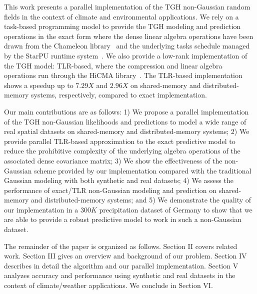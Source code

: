 \documentclass[conference]{IEEEtran}
\begin{document}
This work presents a parallel implementation of the 
TGH non-Gaussian random fields in the context of climate and environmental applications.
We rely on a task-based programming model to provide
the TGH modeling and prediction operations in the exact form where the dense linear algebra operations have been drawn from 
the Chameleon library~\cite{agullo2017achieving}
and the underlying tasks schedule managed by the StarPU 
runtime system~\cite{augonnet2011starpu}. We also provide a low-rank implementation 
of the TGH model: TLR-based, where the compression and linear algebra operations run through the HiCMA library~\cite{hicma-soft}.
The TLR-based implementation shows a 
speedup up to $7.29X$ and $2.96X$ on shared-memory and distributed-memory systems, respectively, compared
to exact implementation.

Our main contributions are as follows: 1) We propose a 
parallel implementation of the TGH non-Gaussian likelihoods and predictions to model a wide range of real spatial 
datasets on shared-memory and distributed-memory systems; 2) We provide parallel TLR-based approximation to the exact predictive model to reduce the 
prohibitive complexity of the underlying algebra operations of the associated dense covariance matrix; 3) We show the effectiveness 
of the non-Gaussian scheme provided by our implementation compared with the traditional Gaussian modeling with both synthetic and real datasets; 4) We assess the performance of exact/TLR non-Gaussian 
modeling and prediction on shared-memory and distributed-memory systems; and 5) We demonstrate the quality of our 
implementation in a $300K$ precipitation dataset of Germany to show that we are 
able to provide a robust predictive model to work in such a non-Gaussian dataset.


The remainder of the paper is organized as follows. 
Section II covers related work. Section III gives an overview and background of our problem. Section IV describes in detail 
the algorithm and our parallel implementation. Section V analyzes accuracy and performance using synthetic and real
datasets in the context of climate/weather applications. 
We conclude in Section VI.
\end{document}

